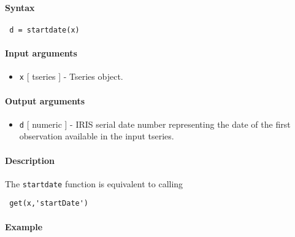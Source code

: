 


	\paragraph{Syntax}
 
 \begin{verbatim}
 d = startdate(x)
 \end{verbatim}
 
 \paragraph{Input arguments}
 
 \begin{itemize}
 \item
   \texttt{x} {[} tseries {]} - Tseries object.
 \end{itemize}
 
 \paragraph{Output arguments}
 
 \begin{itemize}
 \item
   \texttt{d} {[} numeric {]} - IRIS serial date number representing the
   date of the first observation available in the input tseries.
 \end{itemize}
 
 \paragraph{Description}
 
 The \texttt{startdate} function is equivalent to calling
 
 \begin{verbatim}
 get(x,'startDate')
 \end{verbatim}
 
 \paragraph{Example}


